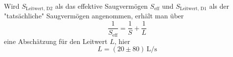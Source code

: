Wird $S_{\text{Leitwert, D2}}$ als das effektive Saugvermögen $S_\text{eff}$ und $S_{\text{Leitwert, D1}}$ als der "tatsächliche" Saugvermögen angenommen, erhält man über 
\begin{equation}
    \frac{1}{S_\text{eff}} = \frac{1}{S} + \frac{1}{L}
\end{equation}
eine Abschätzung für den Leitwert $L$, hier
\begin{equation}
    L = (20 \pm 80) \, \si{\liter\per\second}
\end{equation}

